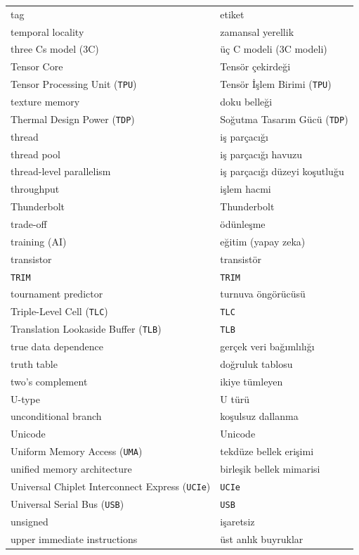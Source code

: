 {\begin{longtable}{@{}p{7.6cm}p{7.6cm}@{}}
tag & etiket \\
temporal locality & zamansal yerellik \\
three Cs model (3C) & üç C modeli (3C modeli) \\
Tensor Core & Tensör çekirdeği \\
Tensor Processing Unit (\texttt{TPU}) & Tensör İşlem Birimi (\texttt{TPU}) \\
texture memory & doku belleği \\
Thermal Design Power (\texttt{TDP}) & Soğutma Tasarım Gücü (\texttt{TDP}) \\
thread & iş parçacığı \\
thread pool & iş parçacığı havuzu \\
thread-level parallelism & iş parçacığı düzeyi koşutluğu \\
throughput & işlem hacmi \\
Thunderbolt & Thunderbolt \\
trade-off & ödünleşme \\
training (AI) & eğitim (yapay zeka) \\
transistor & transistör \\
\texttt{TRIM} & \texttt{TRIM} \\
tournament predictor & turnuva öngörücüsü \\
Triple-Level Cell (\texttt{TLC}) & \texttt{TLC} \\
Translation Lookaside Buffer (\texttt{TLB}) & \texttt{TLB} \\
true data dependence & gerçek veri bağımlılığı \\
truth table & doğruluk tablosu \\
two's complement & ikiye tümleyen \\

U-type & U türü \\
unconditional branch & koşulsuz dallanma \\
Unicode & Unicode \\
Uniform Memory Access (\texttt{UMA}) & tekdüze bellek erişimi \\
unified memory architecture & birleşik bellek mimarisi \\
Universal Chiplet Interconnect Express (\texttt{UCIe}) & \texttt{UCIe} \\
Universal Serial Bus (\texttt{USB}) & \texttt{USB} \\
unsigned & işaretsiz \\
upper immediate instructions & üst anlık buyruklar \\


\end{longtable}}
